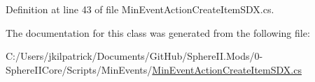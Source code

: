 Definition at line 43 of file Min\+Event\+Action\+Create\+Item\+S\+D\+X.\+cs.



The documentation for this class was generated from the following file\+:\begin{DoxyCompactItemize}
\item 
C\+:/\+Users/jkilpatrick/\+Documents/\+Git\+Hub/\+Sphere\+I\+I.\+Mods/0-\/\+Sphere\+I\+I\+Core/\+Scripts/\+Min\+Events/\mbox{\hyperlink{_min_event_action_create_item_s_d_x_8cs}{Min\+Event\+Action\+Create\+Item\+S\+D\+X.\+cs}}\end{DoxyCompactItemize}
